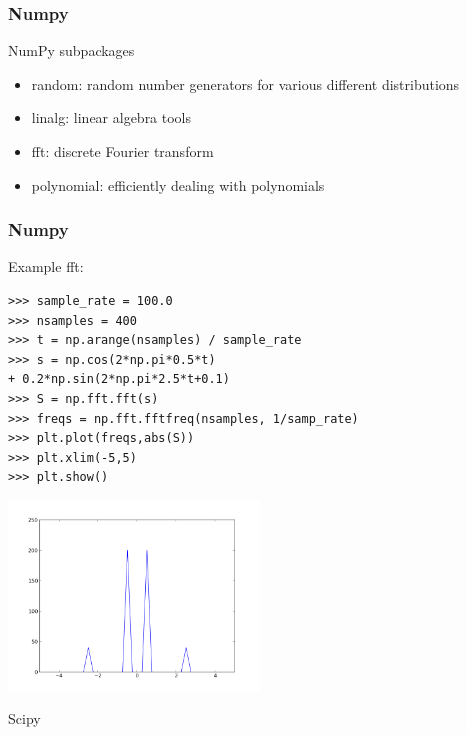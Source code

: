 \begin{frame}[fragile]
\frametitle{Numpy}
NumPy subpackages
\begin{itemize}
  \item random: random number generators for various different distributions
  \item linalg: linear algebra tools
  \item fft: discrete Fourier transform
  \item polynomial: efficiently dealing with polynomials
\end{itemize}
\end{frame}

\begin{frame}[fragile]
\frametitle{Numpy}
Example fft:
\begin{myColorBox}{0.9}{}
\begin{verbatim}
>>> sample_rate = 100.0
>>> nsamples = 400
>>> t = np.arange(nsamples) / sample_rate
>>> s = np.cos(2*np.pi*0.5*t) 
+ 0.2*np.sin(2*np.pi*2.5*t+0.1)
>>> S = np.fft.fft(s)
>>> freqs = np.fft.fftfreq(nsamples, 1/samp_rate)
>>> plt.plot(freqs,abs(S))
>>> plt.xlim(-5,5)
>>> plt.show()
\end{verbatim}
\end{myColorBox}
\pause
\begin{center}
      \includegraphics[width=0.5\textwidth]{pix/fft_example_1}
\end{center}
\end{frame}

\begin{frame}
\begin{center}
\Huge{Scipy}
\end{center}
\end{frame}

